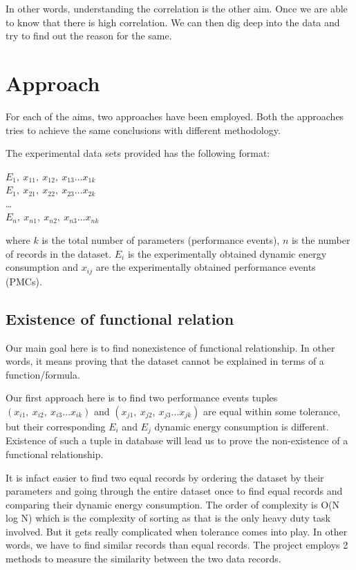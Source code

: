 In other words, understanding the correlation is the other aim. Once we are able to know that there is high correlation. We can then dig deep into the data and try to find out the reason for the same.

\section{Approach}

For each of the aims, two approaches have been employed. Both the approaches tries to achieve the same conclusions with different methodology.

The experimental data sets provided has the following format:

\(E_1,\ x_{11},\ x_{12},\ x_{13} \ldots x_{1k}\)\\
\(E_1,\ x_{21},\ x_{22},\ x_{23} \ldots x_{2k}\)\\
\ldots \\
\(E_n,\ x_{n1},\ x_{n2},\ x_{n3} \ldots x_{nk}\)

where \(k\) is the total number of parameters (performance events), \(n\) is the number of records in the dataset.
\(E_i\) is the experimentally obtained dynamic energy consumption and \(x_{ij}\) are the experimentally obtained performance events (PMCs).

\subsection{Existence of functional relation}

Our main goal here is to find nonexistence of functional relationship. In other words, it means proving that the dataset cannot be explained in terms of a function/formula.

Our first approach here is to find two performance events tuples \((x_{i1},\ x_{i2},\ x_{i3} \ldots x_{ik})\) and \((x_{j1},\ x_{j2},\ x_{j3} \ldots x_{jk})\) are equal within some tolerance, but their corresponding \(E_i\) and \(E_j\) dynamic energy consumption is different. Existence of such a tuple in database will lead us to prove the non-existence of a functional relationship.

It is infact easier to find two equal records by ordering the dataset by their parameters and going through the entire dataset once to find equal records and comparing their dynamic energy consumption. The order of complexity is O(N log N) which is the complexity of sorting as that is the only heavy duty task involved. But it gets really complicated when tolerance comes into play. In other words, we have to find similar records than equal records. The project employs 2 methods to measure the similarity between the two data records.

